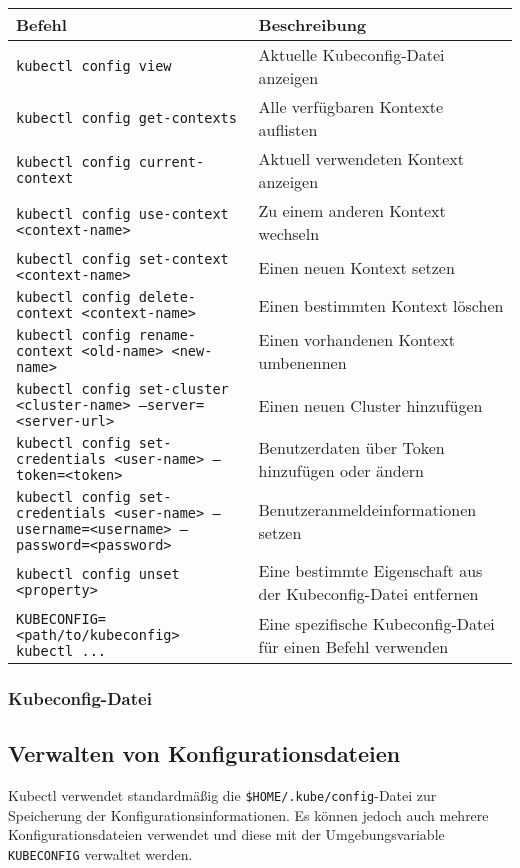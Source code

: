 \noindent
\begin{tabular}{|p{}|p{}|}
\hline
\textbf{Befehl} & \textbf{Beschreibung} \\
\hline
\texttt{kubectl config view} & Aktuelle Kubeconfig-Datei anzeigen \\
\texttt{kubectl config get-contexts} & Alle verfügbaren Kontexte auflisten \\
\texttt{kubectl config current-context} & Aktuell verwendeten Kontext anzeigen \\
\texttt{kubectl config use-context <context-name>} & Zu einem anderen Kontext wechseln \\
\texttt{kubectl config set-context <context-name>} & Einen neuen Kontext setzen \\
\texttt{kubectl config delete-context <context-name>} & Einen bestimmten Kontext löschen \\
\texttt{kubectl config rename-context <old-name> <new-name>} & Einen vorhandenen Kontext umbenennen \\
\texttt{kubectl config set-cluster <cluster-name> --server=<server-url>} & Einen neuen Cluster hinzufügen \\
\texttt{kubectl config set-credentials <user-name> --token=<token>} & Benutzerdaten über Token hinzufügen oder ändern \\
\texttt{kubectl config set-credentials <user-name> --username=<username> --password=<password>} & Benutzeranmeldeinformationen setzen \\
\texttt{kubectl config unset <property>} & Eine bestimmte Eigenschaft aus der Kubeconfig-Datei entfernen \\
\texttt{KUBECONFIG=<path/to/kubeconfig> kubectl ...} & Eine spezifische Kubeconfig-Datei für einen Befehl verwenden \\
\hline
\end{tabular}

\subsubsection{Kubeconfig-Datei}

\newpage
\subsection{Verwalten von Konfigurationsdateien}
Kubectl verwendet standardmäßig die \texttt{\$HOME/.kube/config}-Datei zur Speicherung der Konfigurationsinformationen. Es können jedoch auch mehrere Konfigurationsdateien verwendet und diese mit der Umgebungsvariable \texttt{KUBECONFIG} verwaltet werden.

